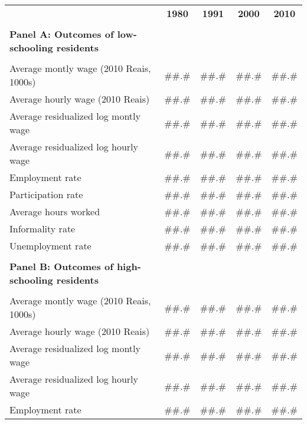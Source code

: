 \begin{tabular}{rcccc}
\toprule
      & \textbf{1980} & \textbf{1991} & \textbf{2000} & \textbf{2010} \\
\cmidrule{2-5}      &       &       &       &  \\
\multicolumn{1}{l}{\textbf{Panel A: Outcomes of low-schooling residents}} &       &       &       &  \\
      &       &       &       &  \\
\multicolumn{1}{l}{Average montly wage (2010 Reais, 1000s)} & \#\#.\# & \#\#.\# & \#\#.\# & \#\#.\# \\
\multicolumn{1}{l}{Average hourly wage  (2010 Reais)} & \#\#.\# & \#\#.\# & \#\#.\# & \#\#.\# \\
\multicolumn{1}{l}{Average residualized log montly wage} & \#\#.\# & \#\#.\# & \#\#.\# & \#\#.\# \\
\multicolumn{1}{l}{Average residualized log hourly wage} & \#\#.\# & \#\#.\# & \#\#.\# & \#\#.\# \\
\multicolumn{1}{l}{Employment rate} & \#\#.\# & \#\#.\# & \#\#.\# & \#\#.\# \\
\multicolumn{1}{l}{Participation rate} & \#\#.\# & \#\#.\# & \#\#.\# & \#\#.\# \\
\multicolumn{1}{l}{Average hours worked} & \#\#.\# & \#\#.\# & \#\#.\# & \#\#.\# \\
\multicolumn{1}{l}{Informality rate} & \#\#.\# & \#\#.\# & \#\#.\# & \#\#.\# \\
\multicolumn{1}{l}{Unemployment rate} & \#\#.\# & \#\#.\# & \#\#.\# & \#\#.\# \\
      &       &       &       &  \\
\multicolumn{1}{l}{\textbf{Panel B: Outcomes of high-schooling residents}} &       &       &       &  \\
      &       &       &       &  \\
\multicolumn{1}{l}{Average montly wage (2010 Reais, 1000s)} & \#\#.\# & \#\#.\# & \#\#.\# & \#\#.\# \\
\multicolumn{1}{l}{Average hourly wage  (2010 Reais)} & \#\#.\# & \#\#.\# & \#\#.\# & \#\#.\# \\
\multicolumn{1}{l}{Average residualized log montly wage} & \#\#.\# & \#\#.\# & \#\#.\# & \#\#.\# \\
\multicolumn{1}{l}{Average residualized log hourly wage} & \#\#.\# & \#\#.\# & \#\#.\# & \#\#.\# \\
\multicolumn{1}{l}{Employment rate} & \#\#.\# & \#\#.\# & \#\#.\# & \#\#.\# \\

\end{tabular}
